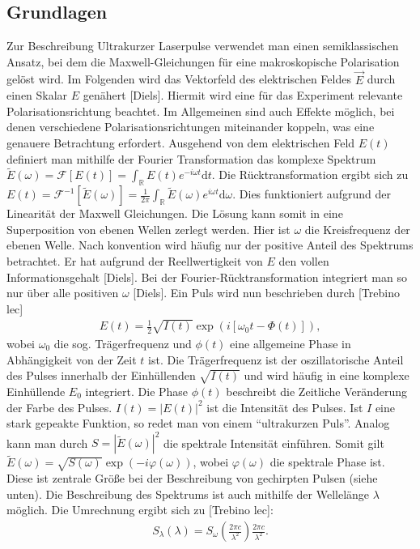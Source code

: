 \documentclass[twoside,        %
               BCOR12mm,       %
               english,ngerman, %
               fleqn,headsepline=false,footsepline=false
              ]{Vorlage/MFPREPORT}
\renewcommand{\d}{\ensuremath{\mathrm{d}}} %
\begin{document}
\subsection{Grundlagen}
Zur Beschreibung Ultrakurzer Laserpulse verwendet man einen semiklassischen
Ansatz, bei dem die Maxwell-Gleichungen für eine makroskopische Polarisation
gelöst wird. Im Folgenden wird das Vektorfeld des elektrischen Feldes $\vec E$
durch einen Skalar $E$ genähert [Diels]. Hiermit wird eine für das Experiment
relevante Polarisationsrichtung beachtet. Im Allgemeinen sind auch Effekte
möglich, bei denen verschiedene Polarisationsrichtungen miteinander koppeln,
was eine genauere Betrachtung erfordert.
Ausgehend von dem elektrischen Feld $E(t)$ definiert man mithilfe der Fourier
Transformation das komplexe Spektrum
$\tilde{E}(\omega)=\mathcal{F}[E(t)]=\int_\mathbb{R}E(t)e^{-i\omega t}\d t
\label{eq:FT}$.
Die Rücktransformation ergibt sich zu $E(t)=\mathcal{F}^{-1}[\tilde
E(\omega)]=\frac{1}{2\pi}\int_{\mathbb R}\tilde E(\omega)e^{i\omega t}\d
\omega$. Dies funktioniert aufgrund der Linearität der Maxwell Gleichungen. Die
Lösung kann somit in eine Superposition von ebenen Wellen zerlegt werden. Hier
ist $\omega$ die Kreisfrequenz der ebenen Welle. Nach konvention wird häufig
nur der positive Anteil des Spektrums betrachtet. Er hat aufgrund der
Reellwertigkeit von $E$ den vollen Informationsgehalt
[Diels]. Bei der Fourier-Rücktransformation integriert man so nur über alle
positiven $\omega$ [Diels].
Ein Puls wird nun beschrieben durch [Trebino lec]
\begin{align}
    E(t)=\frac{1}{2}\sqrt{I(t)}\exp\left(i\left[ \omega _0 t-\Phi(t)
    \right]\right),
    \label{eq:efield}
\end{align}
wobei $\omega_0$ die sog. Trägerfrequenz und $\phi(t)$ eine allgemeine Phase in
Abhängigkeit von der Zeit $t$ ist. Die Trägerfrequenz ist der oszillatorische
Anteil des Pulses innerhalb der Einhüllenden $\sqrt{I(t)}$ und wird häufig in
eine komplexe Einhüllende $E_0$ integriert. Die Phase $\phi(t)$ beschreibt die
Zeitliche Veränderung der Farbe des Pulses. $I(t)=|E(t)|^2$ ist die
Intensität des Pulses. Ist $I$ eine stark gepeakte Funktion, so redet man von
einem ``ultrakurzen Puls''. Analog kann man durch $S=|\tilde E(\omega)|^2$ die
spektrale Intensität einführen. Somit gilt $\tilde
E(\omega)=\sqrt{S(\omega)}\exp(-i\varphi(\omega))\label{eq:spectrum}$, wobei
$\varphi(\omega)$ die spektrale Phase ist. Diese ist zentrale Größe bei der 
Beschreibung von gechirpten Pulsen (siehe unten).
Die Beschreibung des Spektrums ist auch mithilfe der Wellelänge $\lambda$
möglich. Die Umrechnung ergibt sich zu [Trebino lec]:
\begin{align}
    S_\lambda(\lambda)=S_\omega\left(\frac{2\pi c}{\lambda^2}\right)\frac{2\pi
    c}{\lambda^2}.
    \label{eq:lambdaspec}
\end{align}
\end{document}
